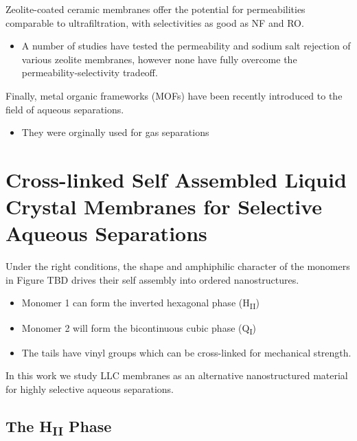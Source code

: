   Zeolite-coated ceramic membranes offer the potential for permeabilities
  comparable to ultrafiltration, with selectivities as good as NF and RO.%
  \begin{itemize}
	\item A number of studies have tested the permeability and sodium salt rejection
    of various zeolite membranes, however none have fully overcome the
    permeability-selectivity tradeoff.~\cite{pendergast_review_2011,auerbach_handbook_2003,li_novel_2007}
  \end{itemize}

  Finally, metal organic frameworks (MOFs) have been recently introduced to the
  field of aqueous separations.
  \begin{itemize}
    \item They were orginally used for gas separations
  \end{itemize}

  
  \section{Cross-linked Self Assembled Liquid Crystal Membranes for Selective Aqueous Separations}
  
  Under the right conditions, the shape and amphiphilic character of the monomers in 
  Figure TBD drives their self assembly into ordered nanostructures.
  \begin{itemize}
    \item Monomer 1 can form the inverted hexagonal phase (H\textsubscript{II})
    \item Monomer 2 will form the bicontinuous cubic phase (Q\textsubscript{I})
    \item The tails have vinyl groups which can be cross-linked for mechanical strength.
  \end{itemize}
  

  In this work we study LLC membranes as an alternative nanostructured material for 
  highly selective aqueous separations.
  
  \subsection{The H\textsubscript{II} Phase}
   
